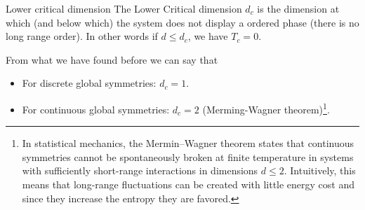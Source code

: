 \documentclass[../../Main/Main.tex]{subfiles}
\begin{document}
\begin{definition}{Lower critical dimension}{}
  The Lower Critical dimension \( d_c \) is the dimension at which (and below which) the system does not display a ordered phase (there is no long range order).
  In other words if \( d \le d_c \), we have \( T_c = 0 \).
\end{definition}
 From what we have found before we can say that
\begin{itemize}
\item For discrete global symmetries: \( d_c =1 \).
\item For continuous global symmetries: \( d_c =2 \) (Merming-Wagner theorem)\footnote{In statistical mechanics, the Mermin–Wagner theorem states that continuous symmetries cannot be spontaneously broken at finite temperature in systems with sufficiently short-range interactions in dimensions \(d \le 2\). Intuitively, this means that long-range fluctuations can be created with little energy cost and since they increase the entropy they are favored.}.
\end{itemize}
\end{document}
